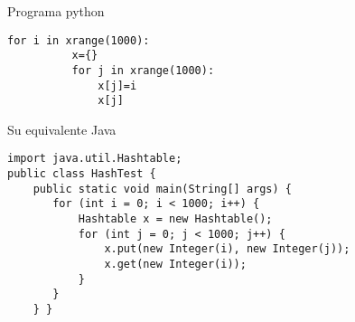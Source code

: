 \documentclass[ucs]{beamer}
\begin{document}
\begin{frame}[fragile]
Programa python
\begin{scriptsize}
\begin{verbatim}
for i in xrange(1000):
          x={}
          for j in xrange(1000):
              x[j]=i
              x[j]
\end{verbatim}
\end{scriptsize}
Su equivalente Java
\begin{scriptsize}
\begin{verbatim}
import java.util.Hashtable;
public class HashTest {
    public static void main(String[] args) {
       for (int i = 0; i < 1000; i++) {
           Hashtable x = new Hashtable();
           for (int j = 0; j < 1000; j++) {
               x.put(new Integer(i), new Integer(j));
               x.get(new Integer(i));
           }
       }
    } }
\end{verbatim}
\end{scriptsize}
\end{frame}





%
%



\end{document}
